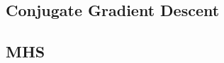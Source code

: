 \begin{appendices}
        \section{Conjugate Gradient Descent} %
        \label{sec:conjugate_gradient_descent}

            \subsection{MHS} %
            \label{sub:mhs}

                \begin{figure}[H]
                    \centering
                    \begin{subfigure}{0.60\textwidth}
                        \caption{}
                        \label{fig:monks_1_MSE_CGD_MHS}
                    \end{subfigure}
                    \begin{subfigure}{0.60\textwidth}
                        \resizebox{\textwidth}{!}{
}
\end{subfigure}
\end{figure}
\end{appendices}
